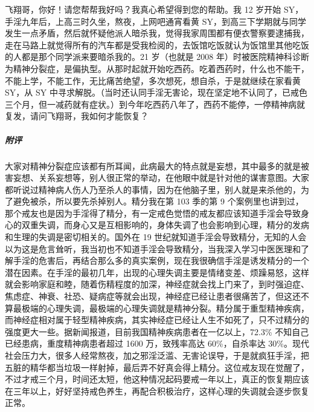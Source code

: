 \begin{case}
    飞翔哥，你好！请您帮帮我好吗？我真心希望得到您的帮助。我 12 岁开始 SY，手淫九年后，上高三时久坐，熬夜，上网吧通宵看黄 SY，到高三下学期就与同学发生一点矛盾，然后就怀疑他派人暗杀我，觉得我家周围都有便衣警察要逮捕我，走在马路上就觉得所有的汽车都是受我检阅的，去饭馆吃饭就认为饭馆里其他吃饭的人都是那个同学派来要暗杀我的。21 岁（也就是 2008 年）时被医院精神科诊断为精神分裂症，是偏执型。从那时起就开始吃西药。吃着西药时，什么也不能干，不能上学，不能工作，无比痛苦绝望，多次想死，想自杀，于是就继续在家看黄 SY，从 SY 中寻求解脱。（当时还认同手淫无害论，现在坚定地不认同了，已戒色三个月，但一减药就有症状。）到今年吃西药八年了，西药不能停，一停精神病就复发，请问飞翔哥，我如何才能恢复？
    \subparagraph{附评} 大家对精神分裂症应该都有所耳闻，此病最大的特点就是妄想，其中最多的就是被害妄想、关系妄想等，别人很正常的举动，在他眼中就是针对他的谋害意图。大家都听说过精神病人伤人乃至杀人的事情，因为在他脑子里，别人就是来杀他的，为了避免被杀，所以要先杀掉别人。精分我在第 103 季的第 9 个案例里也讲到过，那个戒友也是因为手淫得了精分，有一定戒色觉悟的戒友都应该知道手淫会导致身心的双重失调，而身心又是互相影响的，身体失调了也会影响到心理，精分的发病和生理的失调是密切相关的。国外在 19 世纪就知道手淫会导致精分，无知的人会以为这是危言耸听，我当初也不知道手淫会导致精分，当我深入学习中医医理和了解手淫的危害后，再结合那么多的真实案例，现在我很确信手淫是诱发精分的一个潜在因素。在手淫的最初几年，出现的心理失调主要是情绪变差、烦躁易怒，这样就会影响家庭和睦，随着伤精程度的加深，神经症就会找上门来了，到时强迫症、焦虑症、神衰、社恐、疑病症等就会出现，神经症已经让患者很痛苦了，但这还不算最极端的心理失调，最极端的心理失调就是精神分裂。精分属于重型精神疾病，而神经症相对属于轻型精神疾病，其实神经症已经让人生不如死了，只不过精分的强度更大一些。据新闻报道，目前我国精神疾病患者在一亿以上，72.3\% 不知自己已经患病，重度精神病患者超过 1600 万，致残率高达 60\%，自杀率达 30\%。现代社会压力大，很多人经常熬夜，加之邪淫泛滥、无害论误导，于是就疯狂手淫，把五脏的精华都当垃圾一样射掉，最后弄不好真会得上精分。这位戒友现在觉醒了，不过才戒三个月，时间还太短，他这种情况起码要戒一年以上，真正的恢复期应该在三年以上，好好坚持戒色养生，再配合积极治疗，这样心理的失调就会逐步恢复正常。
\end{case}

